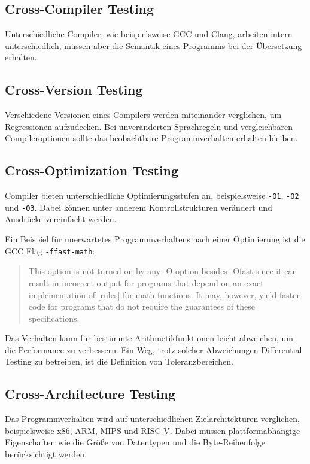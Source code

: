 \documentclass[a4paper,11pt]{article}
\begin{document}
\subsection{Cross-Compiler Testing}

Unterschiedliche Compiler, wie beispielsweise GCC und Clang, arbeiten intern
unterschiedlich, müssen aber die Semantik eines Programms bei der Übersetzung
erhalten.

\subsection{Cross-Version Testing}

Verschiedene Versionen eines Compilers werden miteinander verglichen, um
Regressionen aufzudecken. Bei unveränderten Sprachregeln und vergleichbaren
Compileroptionen sollte das beobachtbare Programmverhalten erhalten bleiben.

\subsection{Cross-Optimization Testing}

Compiler bieten unterschiedliche Optimierungsstufen an, beispielsweise
\texttt{-O1}, \texttt{-O2} und \texttt{-O3}. Dabei können unter anderem
Kontrollstrukturen verändert und Ausdrücke vereinfacht werden.

Ein Beispiel für unerwartetes Programmverhaltens nach einer Optimierung ist die GCC Flag \texttt{-ffast-math}: \parencite{gcc_optimize_options}

\begin{quote}
  This option is not turned on by any -O option besides -Ofast since it can result in incorrect output for programs that depend on an exact implementation of [rules] for math functions. It may, however, yield faster code for programs that do not require the guarantees of these specifications.
\end{quote}

Das Verhalten kann für bestimmte Arithmetikfunktionen leicht abweichen, um die Performance zu verbessern. 
Ein Weg, trotz solcher Abweichungen Differential Testing zu betreiben, ist die Definition von Toleranzbereichen.

\subsection{Cross-Architecture Testing}

Das Programmverhalten wird auf unterschiedlichen Zielarchitekturen verglichen,
beispielsweise x86, ARM, MIPS und RISC-V. Dabei müssen plattformabhängige
Eigenschaften wie die Größe von Datentypen und die Byte-Reihenfolge
berücksichtigt werden.
\end{document}

